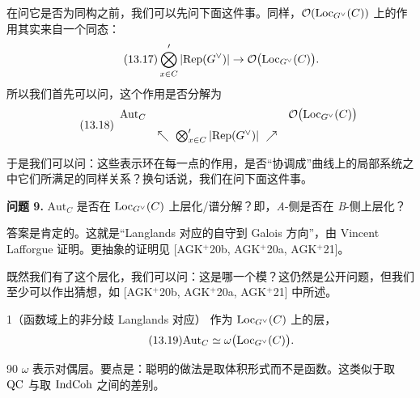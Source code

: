 在问它是否为同构之前，我们可以先问下面这件事。同样，$\mathcal{O}(\mathrm{Loc}_{G^\vee}(C))$ 上的作用其实来自一个同态：
\begin{equation}\tag{13.17}
\bigotimes'_{x\in C}|\mathrm{Rep}(G^\vee)|\to\mathcal{O}\bigl(\mathrm{Loc}_{G^\vee}(C)\bigr).
\end{equation}
所以我们首先可以问，这个作用是否分解为
\begin{equation}\tag{13.18}
\begin{array}{ccc}
\mathrm{Aut}_C & & \mathcal{O}\bigl(\mathrm{Loc}_{G^\vee}(C)\bigr)\\[6pt]
& \nwarrow\ \bigotimes'_{x\in C}|\mathrm{Rep}(G^\vee)|\ \nearrow &
\end{array}
\end{equation}

于是我们可以问：这些表示环在每一点的作用，是否“协调成”曲线上的局部系统之中它们所满足的同样关系？换句话说，我们在问下面这件事。

\medskip\noindent\textbf{问题 9.} $\mathrm{Aut}_C$ 是否在 $\mathrm{Loc}_{G^\vee}(C)$ 上层化/谱分解？即，\emph{A}-侧是否在 \emph{B}-侧上层化？

答案是肯定的。这就是“Langlands 对应的自守到 Galois 方向”，由 Vincent Lafforgue 证明。更抽象的证明见 [AGK$^+$20b, AGK$^+$20a, AGK$^+$21]。

既然我们有了这个层化，我们可以问：这是哪一个模？这仍然是公开问题，但我们至少可以作出猜想，如 [AGK$^+$20b, AGK$^+$20a, AGK$^+$21] 中所述。

\begin{srcconj}{1（函数域上的非分歧 Langlands 对应）}
作为 $\mathrm{Loc}_{G^\vee}(C)$ 上的层，
\begin{equation}\tag{13.19}
\mathrm{Aut}_C\simeq\omega\bigl(\mathrm{Loc}_{G^\vee}(C)\bigr).
\end{equation}
\end{srcconj}

\begin{srcrem}{90}
$\omega$ 表示对偶层。要点是：聪明的做法是取体积形式而不是函数。这类似于取 $\mathrm{QC}$ 与取 $\mathrm{IndCoh}$ 之间的差别。
\end{srcrem}


